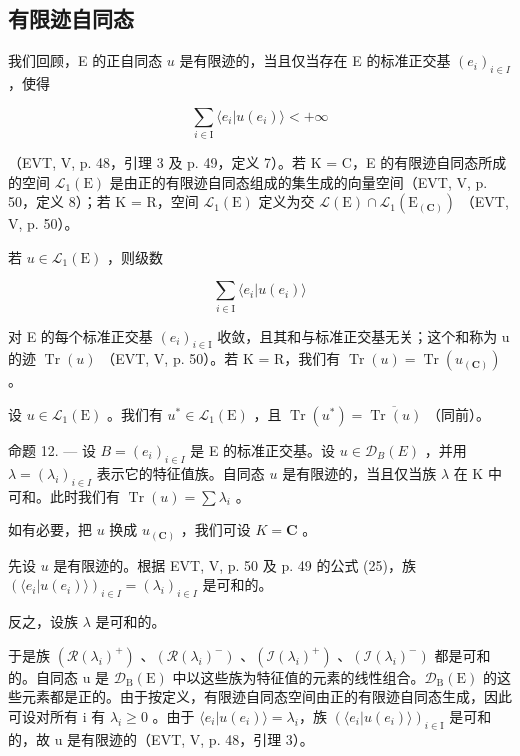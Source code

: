 \subsection{有限迹自同态}

我们回顾，E 的正自同态 \(u\) 是有限迹的，当且仅当存在 E 的标准正交基 \((e_i)_{i \in I}\) ，使得

\[
\sum_ {i \in \mathrm{I}} \langle e _ {i} | u (e _ {i}) \rangle <   + \infty
\]

（EVT, V, p. 48，引理 3 及 p. 49，定义 7）。若 K = C，E 的有限迹自同态所成的空间 \(\mathcal{L}_1(\mathrm{E})\) 是由正的有限迹自同态组成的集生成的向量空间（EVT, V, p. 50，定义 8）；若 K = R，空间 \(\mathcal{L}_1(\mathrm{E})\) 定义为交 \(\mathcal{L}(\mathrm{E}) \cap \mathcal{L}_1(\mathrm{E}_{(\mathbf{C})})\) （EVT, V, p. 50）。

若 \(u\in \mathcal{L}_1(\mathrm{E})\) ，则级数

\[
\sum_ {i \in \mathrm{I}} \langle e _ {i} | u (e _ {i}) \rangle
\]

对 E 的每个标准正交基 \((e_{i})_{i\in\mathrm{I}}\) 收敛，且其和与标准正交基无关；这个和称为 u 的迹 \(\operatorname{Tr}(u)\) （EVT, V, p. 50）。若 K = R，我们有 \(\operatorname{Tr}(u) = \operatorname{Tr}(u_{(\mathbf{C})})\) 。

设 \(u \in \mathcal{L}_1(\mathrm{E})\) 。我们有 \(u^* \in \mathcal{L}_1(\mathrm{E})\) ，且 \(\operatorname{Tr}(u^*) = \overline{\operatorname{Tr}(u)}\) （同前）。

命题 12. --- 设 \(B = (e_i)_{i \in I}\) 是 E 的标准正交基。设 \(u \in \mathcal{D}_B(E)\) ，并用 \(\lambda = (\lambda_i)_{i \in I}\) 表示它的特征值族。自同态 \(u\) 是有限迹的，当且仅当族 \(\lambda\) 在 K 中可和。此时我们有 \(\operatorname{Tr}(u) = \sum \lambda_i\) 。

如有必要，把 \(u\) 换成 \(u_{(\mathbf{C})}\) ，我们可设 \(K = \mathbf{C}\) 。

先设 \(u\) 是有限迹的。根据 EVT, V, p. 50 及 p. 49 的公式 (25)，族 \((\langle e_i | u(e_i) \rangle)_{i \in I} = (\lambda_i)_{i \in I}\) 是可和的。

反之，设族 \(\lambda\) 是可和的。

于是族 \((\mathcal{R}(\lambda_{i})^{+})\) 、\((\mathcal{R}(\lambda_{i})^{-})\) 、\((\mathcal{I}(\lambda_{i})^{+})\) 、\((\mathcal{I}(\lambda_{i})^{-})\) 都是可和的。自同态 u 是 \(\mathcal{D}_{\mathrm{B}}(\mathrm{E})\) 中以这些族为特征值的元素的线性组合。\(\mathcal{D}_{\mathrm{B}}(\mathrm{E})\) 的这些元素都是正的。由于按定义，有限迹自同态空间由正的有限迹自同态生成，因此可设对所有 i 有 \(\lambda_{i} \geqslant 0\) 。由于 \(\langle e_{i} | u(e_{i}) \rangle = \lambda_{i}\)，族 \((\langle e_{i} | u(e_{i}) \rangle)_{i \in \mathrm{I}}\) 是可和的，故 u 是有限迹的（EVT, V, p. 48，引理 3）。

